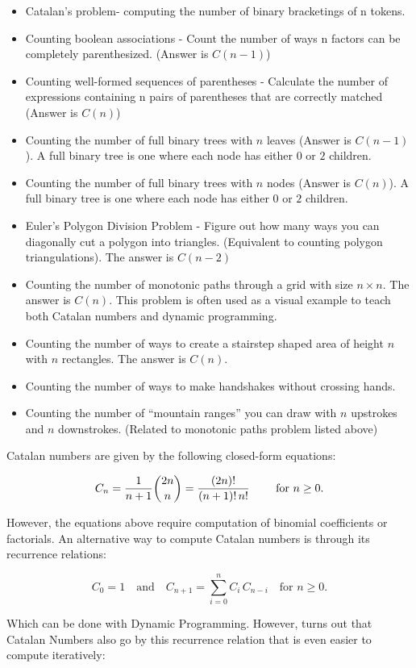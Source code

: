 \begin{itemize}
\item Catalan's problem- computing the number of binary bracketings of n tokens.
\item Counting boolean associations - Count the number of ways n factors can be completely parenthesized. (Answer is $C(n-1)$)
\item Counting well-formed sequences of parentheses - Calculate the number of expressions containing n pairs of parentheses that are correctly matched (Answer is $C(n)$)
\item Counting the number of full binary trees with $n$ leaves (Answer is $C(n-1)$). A full binary tree is one where each node has either $0$ or $2$ children.
\item Counting the number of full binary trees with $n$ nodes (Answer is $C(n)$). A full binary tree is one where each node has either $0$ or $2$ children.
\item Euler's Polygon Division Problem - Figure out how many ways you can diagonally cut a polygon into triangles. (Equivalent to counting polygon triangulations). The answer is $C(n-2)$
\item Counting the number of monotonic paths through a grid with size $n \times n$. The answer is $C(n)$. This problem is often used as a visual example to teach both Catalan numbers and dynamic programming.
\item Counting the number of ways to create a stairstep shaped area of height $n$ with $n$ rectangles. The answer is $C(n)$.
\item Counting the number of ways to make handshakes without crossing hands.
\item Counting the number of ``mountain ranges'' you can draw with $n$ upstrokes and $n$ downstrokes. (Related to monotonic paths problem listed above)
\end{itemize}

Catalan numbers are given by the following closed-form equations:

\[C_n = \dfrac{1}{n+1}{\dbinom{2n}{n}} = \dfrac{(2n)!}{(n+1)!\,n!} \qquad\mbox{ for }n\ge 0.\]

However, the equations above require computation of binomial coefficients or factorials. An alternative way to compute Catalan numbers is through its recurrence relations:

\[C_0 = 1 \quad \mbox{and} \quad C_{n+1}=\displaystyle\sum_{i=0}^{n}C_i\,C_{n-i}\quad\mbox{for }n\ge 0.\]

Which can be done with Dynamic Programming. However, turns out that Catalan Numbers also go by this recurrence relation that is even easier to compute iteratively:

